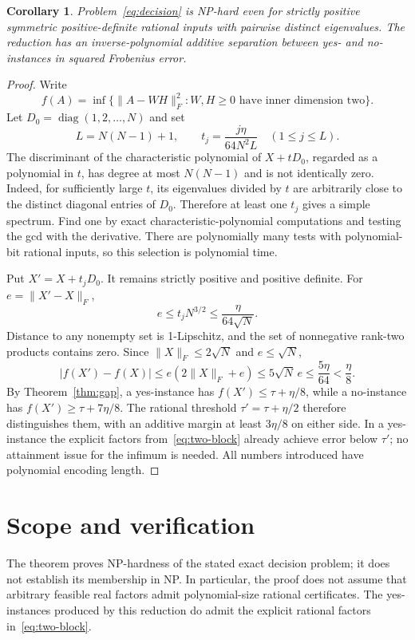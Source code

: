 \documentclass[11pt]{article}
\newtheorem{corollary}[theorem]{Corollary}
\begin{document}
\begin{corollary}\label{cor:simple}
Problem~\eqref{eq:decision} is NP-hard even for strictly positive symmetric positive-definite rational inputs with pairwise distinct eigenvalues. The reduction has an inverse-polynomial additive separation between yes- and no-instances in squared Frobenius error.
\end{corollary}
\begin{proof}
Write
\[
 f(A)=\inf\{\|A-WH\|_F^2:W,H\geq0\text{ have inner dimension two}\}.
\]
Let $D_0=\operatorname{diag}(1,2,\ldots,N)$ and set
\[
 L=N(N-1)+1,\qquad t_j=\frac{j\eta}{64N^2L}\quad(1\leq j\leq L).
\]
The discriminant of the characteristic polynomial of $X+tD_0$, regarded as a polynomial in $t$, has degree at most $N(N-1)$ and is not identically zero. Indeed, for sufficiently large $t$, its eigenvalues divided by $t$ are arbitrarily close to the distinct diagonal entries of $D_0$. Therefore at least one $t_j$ gives a simple spectrum. Find one by exact characteristic-polynomial computations and testing the gcd with the derivative. There are polynomially many tests with polynomial-bit rational inputs, so this selection is polynomial time.

Put $X'=X+t_jD_0$. It remains strictly positive and positive definite. For $e=\|X'-X\|_F$,
\[
 e\leq t_jN^{3/2}\leq\frac\eta{64\sqrt N}.
\]
Distance to any nonempty set is 1-Lipschitz, and the set of nonnegative rank-two products contains zero. Since $\|X\|_F\leq2\sqrt N$ and $e\leq\sqrt N$,
\[
 |f(X')-f(X)|
 \leq e(2\|X\|_F+e)
 \leq5\sqrt N\,e
 \leq\frac{5\eta}{64}<\frac\eta8.
\]
By Theorem~\ref{thm:gap}, a yes-instance has $f(X')\leq\tau+\eta/8$, while a no-instance has $f(X')\geq\tau+7\eta/8$. The rational threshold $\tau'=\tau+\eta/2$ therefore distinguishes them, with an additive margin at least $3\eta/8$ on either side. In a yes-instance the explicit factors from~\eqref{eq:two-block} already achieve error below $\tau'$; no attainment issue for the infimum is needed. All numbers introduced have polynomial encoding length.
\end{proof}

\section{Scope and verification}
The theorem proves NP-hardness of the stated exact decision problem; it does not establish its membership in NP. In particular, the proof does not assume that arbitrary feasible real factors admit polynomial-size rational certificates. The yes-instances produced by this reduction do admit the explicit rational factors in~\eqref{eq:two-block}.
\end{document}

